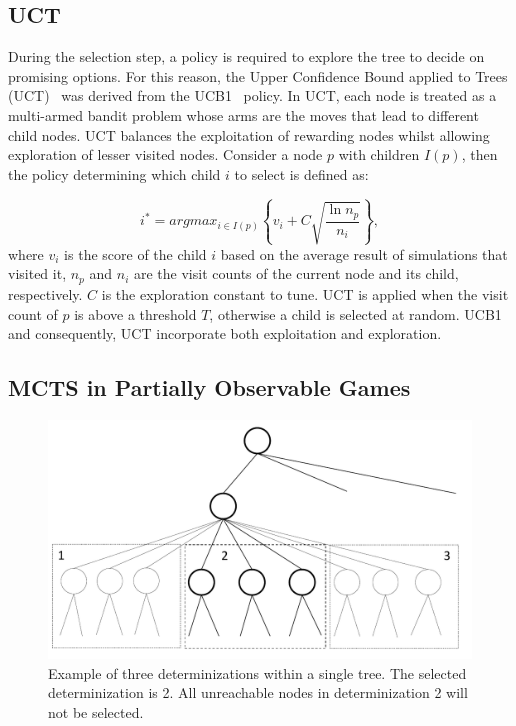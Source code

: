 \documentclass[a4paper]{llncs}
\begin{document}
\subsection{UCT}
\label{subsec:uct}
During the selection step, a policy is required to explore the tree to decide on promising options. For this reason, the Upper Confidence Bound applied to Trees (UCT)~\cite{kocsis2006bandit} was derived from the UCB1~\cite{auer2002using} policy. In UCT, each node is treated as a multi-armed bandit problem whose arms are the moves that lead to different child nodes. UCT balances the exploitation of rewarding nodes whilst allowing exploration of lesser visited nodes. Consider a node $p$ with children $I(p)$, then the policy determining which child $i$ to select is defined as:

\begin{equation}
\label{eq:uct}
i^* = argmax_{i \in I(p)}\left\{ v_i + C \sqrt{ \frac{\ln{n_p}}{n_i}}\right\},
\end{equation}
where $v_i$ is the score of the child $i$ based on the average result of simulations that visited it, $n_p$ and $n_i$ are the visit counts of the current node and its child, respectively. $C$ is the exploration constant to tune. UCT is applied when the visit count of $p$ is above a threshold $T$, otherwise a child is selected at random. UCB1 and consequently, UCT incorporate both exploitation and exploration.

\subsection{MCTS in Partially Observable Games}

\label{subsec:mcts-po-games}
\begin{figure}[t]
\begin{center}
\includegraphics[clip, width=\textwidth]{determinizationc.pdf}
\caption{Example of three determinizations within a single tree. The selected determinization is 2. All unreachable nodes in determinization 2 will not be selected.}
\label{fig:det}
\end{center}
\end{figure}
\end{document}
